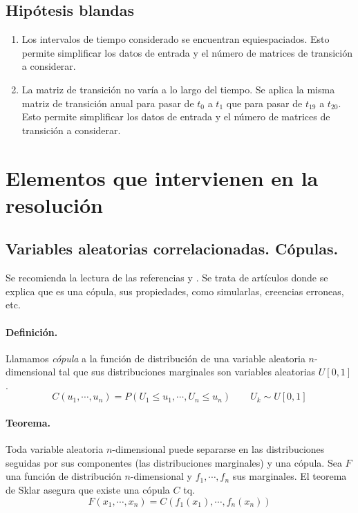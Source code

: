 \subsection{Hip\'otesis blandas}
\begin{enumerate}
\item Los intervalos de tiempo considerado se encuentran equiespaciados. Esto 
permite simplificar los datos de entrada y el n\'umero de matrices de 
transici\'on a considerar.
\item La matriz de transici\'on no var\'ia a lo largo del tiempo. Se aplica 
la misma matriz de transici\'on anual para pasar de $t_0$ a $t_1$ que para 
pasar de $t_{19}$ a $t_{20}$. Esto permite simplificar los datos de entrada y 
el n\'umero de matrices de transici\'on a considerar.
\end{enumerate}


\section{Elementos que intervienen en la resoluci\'on}

\subsection{Variables aleatorias correlacionadas. C\'opulas.}

Se recomienda la lectura de las referencias \cite{copu:wang} y 
\cite{copu:pitfalls}. Se trata de art\'iculos donde se explica que es una 
c\'opula, sus propiedades, como simularlas, creencias erroneas, etc.

\paragraph{Definici\'on.} Llamamos \emph{c\'opula} a la funci\'on
de distribuci\'on de una variable aleatoria $n$-dimensional tal que sus distribuciones
marginales  son variables aleatorias $U[0,1]$.
\begin{displaymath}
C(u_1, \cdots,u_n)=P(U_1 \leq u_1, \cdots, U_n \leq u_n) \qquad U_k \sim U[0,1]
\end{displaymath}

\paragraph{Teorema.}  Toda variable aleatoria $n$-dimensional
puede separarse en las distribuciones seguidas por sus componentes (las distribuciones
marginales) y una c\'opula. Sea $F$ una funci\'on de distribuci\'on $n$-dimensional y
$f_1,\cdots, f_n$ sus marginales. El teorema de Sklar asegura que existe una 
c\'opula $C$ tq.
\begin{displaymath}
F(x_1, \cdots,x_n) = C(f_1(x_1), \cdots, f_n(x_n)) 
\end{displaymath}

